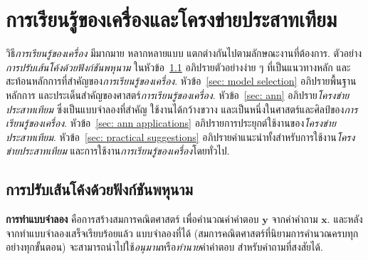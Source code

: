 \chapter{การเรียนรู้ของเครื่องและโครงข่ายประสาทเทียม}
\label{chapter: ANN}

\begin{Parallel}[c]{0.45\textwidth}{0.4\textwidth}
\end{Parallel}
\vspace{1cm}


วิธี\textit{การเรียนรู้ของเครื่อง}
มีมากมาย หลากหลายแบบ แตกต่างกันไปตามลักษณะงานที่ต้องการ.
ตัวอย่าง \textit{การปรับเส้นโค้งด้วยฟังก์ชันพหุนาม}
ในหัวข้อ~\ref{sec: curve fitting} อภิปรายตัวอย่างง่าย ๆ 
ที่เป็นแนวทางหลัก
และสะท้อนหลักการที่สำคัญของ\textit{การเรียนรู้ของเครื่อง}.
หัวข้อ~\ref{sec: model selection}
อภิปรายพื้นฐาน หลักการ และประเด็นสำคัญของศาสตร์\textit{การเรียนรู้ของเครื่อง}. 
หัวข้อ~\ref{sec: ann}
อภิปราย\textit{โครงข่ายประสาทเทียม}
ซึ่งเป็นแบบจำลองที่สำคัญ ใช้งานได้กว้างขวาง
และเป็นหนึ่งในศาสตร์และศิลป์ของ\textit{การเรียนรู้ของเครื่อง}.
หัวข้อ~\ref{sec: ann applications}
อภิปรายการประยุกต์ใช้งานของ\textit{โครงข่ายประสาทเทียม}.
หัวข้อ~\ref{sec: practical suggestions}
อภิปรายคำแนะนำทั้งสำหรับการใช้งาน\textit{โครงข่ายประสาทเทียม} และการใช้งาน\textit{การเรียนรู้ของเครื่อง}โดยทั่วไป.

\section{การปรับเส้นโค้งด้วยฟังก์ชันพหุนาม}
\label{sec: curve fitting}

\textbf{การทำแบบจำลอง} คือการสร้างสมการคณิตศาสตร์ เพื่อคำนวณค่าคำตอบ $\bm{y}$ จากค่าคำถาม $\bm{x}$.
และหลังจากทำแบบจำลองเสร็จเรียบร้อยแล้ว
แบบจำลองที่ได้ (สมการคณิตศาสตร์ที่นิยามการคำนวณครบทุกอย่างทุกขั้นตอน)
จะสามารถนำไปใช้\textit{อนุมาน}หรือ\textit{ทำนาย}ค่าคำตอบ สำหรับคำถามที่สงสัยได้.

